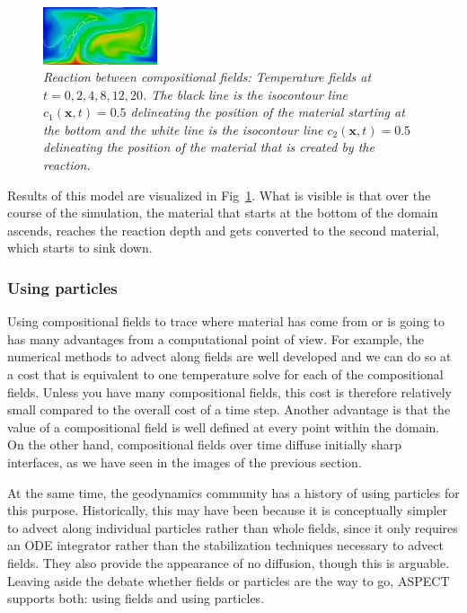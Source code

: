 \documentclass{article}
\newcommand{\aspect}{\textsc{ASPECT}}
\begin{document}
\begin{figure}
  \hfill
  \includegraphics[width=0.3\textwidth]{cookbooks/composition-reaction/doc/20.png}
  \caption{\it Reaction between compositional fields: Temperature fields at $t=0, 2, 4, 8,
  12, 20$. The black line is the isocontour line $c_1(\mathbf x,t)=0.5$
    delineating the position of the material starting at the bottom and the white line is the    isocontour line $c_2(\mathbf x,t)=0.5$
    delineating the position of the material that is created by the reaction.}
  \label{fig:composition-reaction}
\end{figure}

Results of this model are visualized in
Fig~\ref{fig:composition-reaction}. What is visible is
that over the course of the simulation, the material that starts at the bottom
of the domain ascends, reaches the reaction depth and gets converted to the second material, which starts to sink down.



\subsubsection{Using particles}
\label{sec:cookbooks-particles}

Using compositional fields to trace where material has come from or is going to
has many advantages from a computational point of view. For example, the
numerical methods to advect along fields are well developed and we can do so at
a cost that is equivalent to one temperature solve for each of the compositional
fields. Unless you have many compositional fields, this cost is therefore
relatively small compared to the overall cost of a time step. Another advantage
is that the value of a compositional field is well defined at every point within
the domain. On the other hand, compositional fields over time diffuse initially
sharp interfaces, as we have seen in the images of the previous section.

At the same time, the geodynamics community has a history of using particles for
this purpose. Historically, this may have been because it is conceptually
simpler to advect along individual particles rather than whole fields, since it
only requires an ODE integrator rather than the stabilization techniques
necessary to advect fields. They also provide the appearance of no diffusion,
though this is arguable. Leaving aside the debate whether fields or particles are the
way to go, \aspect{} supports both: using fields and using particles.
\end{document}
